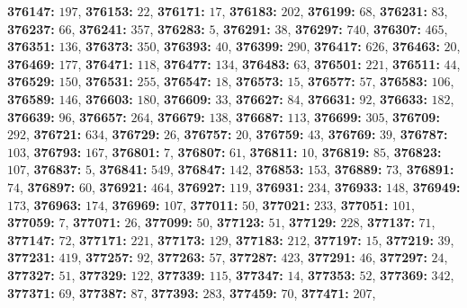 \textsf{\bfseries 376147:} $197$, \textsf{\bfseries 376153:} $22$, \textsf{\bfseries 376171:} $17$, \textsf{\bfseries 376183:} $202$, \textsf{\bfseries 376199:} $68$, \textsf{\bfseries 376231:} $83$, \textsf{\bfseries 376237:} $66$, \textsf{\bfseries 376241:} $357$, \textsf{\bfseries 376283:} $5$, \textsf{\bfseries 376291:} $38$, \textsf{\bfseries 376297:} $740$, \textsf{\bfseries 376307:} $465$, \textsf{\bfseries 376351:} $136$, \textsf{\bfseries 376373:} $350$, \textsf{\bfseries 376393:} $40$, \textsf{\bfseries 376399:} $290$, \textsf{\bfseries 376417:} $626$, \textsf{\bfseries 376463:} $20$, \textsf{\bfseries 376469:} $177$, \textsf{\bfseries 376471:} $118$, \textsf{\bfseries 376477:} $134$, \textsf{\bfseries 376483:} $63$, \textsf{\bfseries 376501:} $221$, \textsf{\bfseries 376511:} $44$, \textsf{\bfseries 376529:} $150$, \textsf{\bfseries 376531:} $255$, \textsf{\bfseries 376547:} $18$, \textsf{\bfseries 376573:} $15$, \textsf{\bfseries 376577:} $57$, \textsf{\bfseries 376583:} $106$, \textsf{\bfseries 376589:} $146$, \textsf{\bfseries 376603:} $180$, \textsf{\bfseries 376609:} $33$, \textsf{\bfseries 376627:} $84$, \textsf{\bfseries 376631:} $92$, \textsf{\bfseries 376633:} $182$, \textsf{\bfseries 376639:} $96$, \textsf{\bfseries 376657:} $264$, \textsf{\bfseries 376679:} $138$, \textsf{\bfseries 376687:} $113$, \textsf{\bfseries 376699:} $305$, \textsf{\bfseries 376709:} $292$, \textsf{\bfseries 376721:} $634$, \textsf{\bfseries 376729:} $26$, \textsf{\bfseries 376757:} $20$, \textsf{\bfseries 376759:} $43$, \textsf{\bfseries 376769:} $39$, \textsf{\bfseries 376787:} $103$, \textsf{\bfseries 376793:} $167$, \textsf{\bfseries 376801:} $7$, \textsf{\bfseries 376807:} $61$, \textsf{\bfseries 376811:} $10$, \textsf{\bfseries 376819:} $85$, \textsf{\bfseries 376823:} $107$, \textsf{\bfseries 376837:} $5$, \textsf{\bfseries 376841:} $549$, \textsf{\bfseries 376847:} $142$, \textsf{\bfseries 376853:} $153$, \textsf{\bfseries 376889:} $73$, \textsf{\bfseries 376891:} $74$, \textsf{\bfseries 376897:} $60$, \textsf{\bfseries 376921:} $464$, \textsf{\bfseries 376927:} $119$, \textsf{\bfseries 376931:} $234$, \textsf{\bfseries 376933:} $148$, \textsf{\bfseries 376949:} $173$, \textsf{\bfseries 376963:} $174$, \textsf{\bfseries 376969:} $107$, \textsf{\bfseries 377011:} $50$, \textsf{\bfseries 377021:} $233$, \textsf{\bfseries 377051:} $101$, \textsf{\bfseries 377059:} $7$, \textsf{\bfseries 377071:} $26$, \textsf{\bfseries 377099:} $50$, \textsf{\bfseries 377123:} $51$, \textsf{\bfseries 377129:} $228$, \textsf{\bfseries 377137:} $71$, \textsf{\bfseries 377147:} $72$, \textsf{\bfseries 377171:} $221$, \textsf{\bfseries 377173:} $129$, \textsf{\bfseries 377183:} $212$, \textsf{\bfseries 377197:} $15$, \textsf{\bfseries 377219:} $39$, \textsf{\bfseries 377231:} $419$, \textsf{\bfseries 377257:} $92$, \textsf{\bfseries 377263:} $57$, \textsf{\bfseries 377287:} $423$, \textsf{\bfseries 377291:} $46$, \textsf{\bfseries 377297:} $24$, \textsf{\bfseries 377327:} $51$, \textsf{\bfseries 377329:} $122$, \textsf{\bfseries 377339:} $115$, \textsf{\bfseries 377347:} $14$, \textsf{\bfseries 377353:} $52$, \textsf{\bfseries 377369:} $342$, \textsf{\bfseries 377371:} $69$, \textsf{\bfseries 377387:} $87$, \textsf{\bfseries 377393:} $283$, \textsf{\bfseries 377459:} $70$, \textsf{\bfseries 377471:} $207$, 
